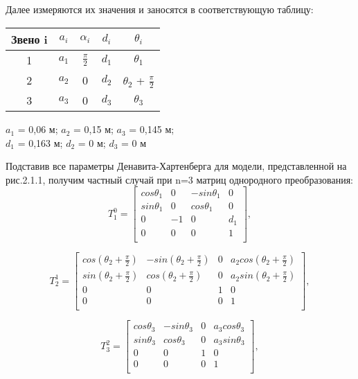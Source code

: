 \begin{table}[h!]
\hspace*{\parindent}Далее измеряются их значения и заносятся в соответствующую таблицу:\\
\begin{center}
\begin{tabular}{|c|c|c|c|c|}
\hline
Звено i & $a_i$ & $\alpha_i$ & $d_i$ & $\theta_i$ \\
\hline
1 & $a_1$ & $\frac{\pi}{2}$ & $d_1$ & $\theta_1$\\
\hline
2 & $a_2$ & 0 & $d_2$ & $\theta_2$ + $\frac{\pi}{2}$\\
\hline
3 & $a_3$ & 0 & $d_3$ & $\theta_3$\\
\hline
\end{tabular}
\end{center}
\end{table} 
\begin{center}
$a_1$ = 0,06 м;  $a_2$ = 0,15 м;  $a_3$ = 0,145 м; \\
$d_1$ = 0,163 м;  $d_2$ = 0 м;  $d_3$ = 0 м \\
\end{center}
\hspace*{\parindent}Подставив все параметры Денавита-Хартенберга для модели, представленной на рис.2.1.1, получим частный случай при n=3 матриц однородного преобразования:\\

\begin{equation*}\label{eq:model}
T_1^0 = 
     \begin{bmatrix}
    cos{\theta_1} & 0 &  -sin{\theta_1} & 0 \\
    sin{\theta_1} & 0 &  cos{\theta_1} & 0 \\
    0 & -1 & 0 & d_1\\
    0 & 0 & 0 & 1\\
    \end{bmatrix}
    ,
\end{equation*} 

\begin{equation*}\label{eq:model}
T_2^1 = 
     \begin{bmatrix}
    cos{(\theta_2 + \frac{\pi}{2})} & -sin{(\theta_2 + \frac{\pi}{2})} & 0 & a_2 cos{(\theta_2 + \frac{\pi}{2})} \\
    sin{(\theta_2 + \frac{\pi}{2})} & cos{(\theta_2 + \frac{\pi}{2})} & 0 & a_2 sin{(\theta_2 + \frac{\pi}{2})}\\
    0 & 0 & 1 & 0\\
    0 & 0 & 0 & 1\\
    \end{bmatrix}
    ,
\end{equation*} 

\begin{equation*}\label{eq:model}
T_3^2 = 
      \begin{bmatrix}
    cos{\theta_3 } & -sin{\theta_3} & 0 & a_3 cos{\theta_3} \\
    sin{\theta_3} & cos{\theta_3} & 0 & a_3 sin{\theta_3}\\
    0 & 0 & 1 & 0\\
    0 & 0 & 0 & 1\\
    \end{bmatrix}
    ,
\end{equation*}  